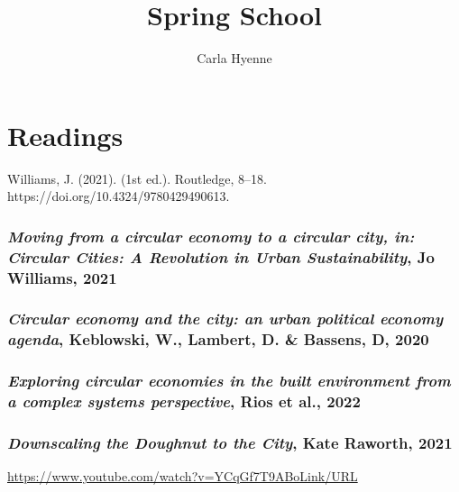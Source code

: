 \documentclass{article}
\title{Spring School}
\author{Carla Hyenne}
\begin{document}
\maketitle

\tableofcontents

\pagebreak

\section{Readings}


Williams, J. (2021).  (1st ed.). Routledge, 8–18. https://doi.org/10.4324/9780429490613.

\subsubsection{\textit{Moving from a circular economy to a circular city, in: Circular Cities: A Revolution in Urban Sustainability}, Jo Williams, 2021}

\begin{outline}
	\1 
\end{outline}

\subsubsection{\textit{Circular economy and the city: an urban political economy agenda}, Keblowski, W., Lambert, D. \& Bassens, D, 2020}

\begin{outline}
	\1 
\end{outline}

\subsubsection{\textit{Exploring circular economies in the built environment from a complex systems perspective}, Rios et al., 2022}

\begin{outline}
	\1 
\end{outline}

\subsubsection{\textit{Downscaling the Doughnut to the City}, Kate Raworth, 2021}

\url{https://www.youtube.com/watch?v=YCqGf7T9ABoLink/URL}

\begin{outline}
	\1 
\end{outline}

\printbibliography
\end{document}
